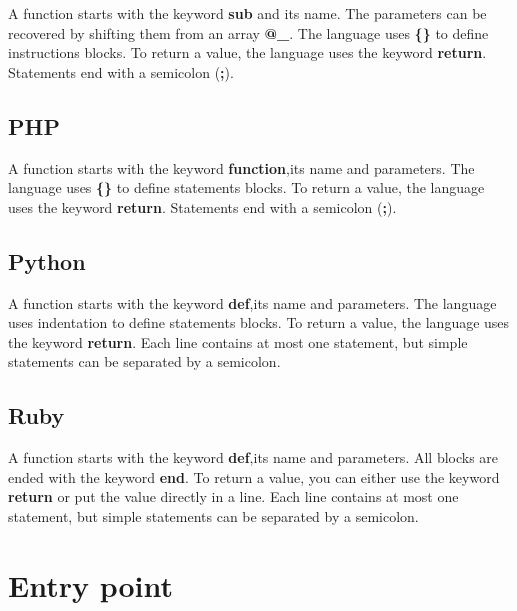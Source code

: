 \documentclass{KodeBook}
\begin{document}
A function starts with the keyword \textbf{sub} and its name.
The parameters can be recovered by shifting them from an array \textbf{@\_}.
The language uses \textbf{\{\}} to define instructions blocks.
To return a value, the language uses the keyword \textbf{return}.
Statements end with a semicolon (\textbf{;}).



\subsection{PHP}

A function starts with the keyword \textbf{function},its name and parameters.
The language uses \textbf{\{\}} to define statements blocks.
To return a value, the language uses the keyword \textbf{return}.
Statements end with a semicolon (\textbf{;}).



\subsection{Python}

A function starts with the keyword \textbf{def},its name and parameters.
The language uses indentation to define statements blocks.
To return a value, the language uses the keyword \textbf{return}.
Each line contains at most one statement, but simple statements can be separated by a semicolon.



\subsection{Ruby}

A function starts with the keyword \textbf{def},its name and parameters.
All blocks are ended with the keyword \textbf{end}.
To return a value, you can either use the keyword \textbf{return} or put the value directly in a line.
Each line contains at most one statement, but simple statements can be separated by a semicolon.




\section{Entry point}
\end{document}
